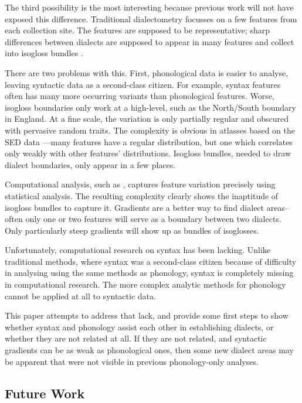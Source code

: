\documentclass[11pt]{article}
\begin{document}
The third possibility is the most interesting because previous work
will not have exposed this difference. Traditional dialectometry
focusses on a few features from each collection site. The features
are supposed to be representative; sharp differences between dialects
are supposed to appear in many features and collect into isogloss
bundles \cite{chambers92}.

There are two problems with this. First, phonological data is easier
to analyse, leaving syntactic data as a second-class citizen. For
example, syntax features often has many more occurring variants than
phonological features. Worse, isogloss boundaries only work at a
high-level, such as the North/South boundary in England. At a
fine scale, the variation is only partially regular and obscured with
pervasive random traits. The complexity is obvious in atlasses based
on the SED data \cite{orton78}---many features
have a regular distribution, but one which correlates only weakly with
other features' distributions. Isogloss bundles, needed to draw
dialect boundaries, only appear in a few places.

Computational analysis, such as
\cite{shackleton07}, captures feature variation precisely using
statistical analysis. The resulting complexity clearly shows the
inaptitude of isogloss bundles to capture it. Gradients are a better
way to find dialect areas--often only one or two features will serve
as a boundary between two dialects. Only particularly steep gradients will show
up as bundles of isoglosses.

Unfortunately, computational research on syntax has been
lacking. Unlike traditional methods, where syntax was a second-class
citizen because of difficulty in analysing using the same methods as
phonology, syntax is completely missing in computational
research. The more complex analytic methods for phonology cannot be applied at all
to syntactic data.

This paper attempts to address that lack, and provide some first steps
to show whether syntax and phonology assist each other in establishing
dialects, or whether they are not related at all. If they are not
related, and syntactic gradients can be as weak as phonological ones,
then some new dialect areas may be apparent that were not visible in
previous phonology-only analyses.

\subsection{Future Work}
\end{document}
